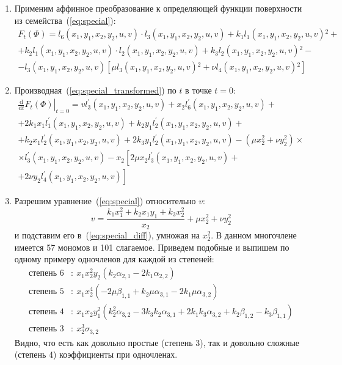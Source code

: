 \documentclass[../main.tex]{subfiles}
\begin{document}
\begin{enumerate}
\item Применим аффинное преобразование к определяющей функции поверхности из семейства~(\ref{eq:special}):
\begin{multline}\label{eq:special_transformed}
F_t(\Phi) = l_6(x_1, y_1, x_2, y_2, u, v) \cdot l_3(x_1, y_1, x_2, y_2, u, v) + k_1 l_1(x_1, y_1, x_2, y_2, u, v){}^2 + \\ + k_2 l_1(x_1, y_1, x_2, y_2, u, v)\cdot l_2(x_1, y_1, x_2, y_2, u, v) + k_3 l_2(x_1, y_1, x_2, y_2, u, v){}^2 - \\ 
- l_3(x_1, y_1, x_2, y_2, u, v) \left[\mu l_3(x_1, y_1, x_2, y_2, u, v){}^2+\nu  l_4(x_1, y_1, x_2, y_2, u, v){}^2\right]
\end{multline}

\item Производная~(\ref{eq:special_transformed}) по $t$ в точке $t = 0$:
\begin{multline}\label{eq:special_diff}
\left.\frac{\mathrm d}{\mathrm{d}t} F_t\left(\Phi\right)\right|_{t = 0} = v l_3^{\prime}(x_1, y_1, x_2, y_2, u, v) + x_2 l_6^{\prime}(x_1, y_1, x_2, y_2, u, v) + \\
+ 2 k_1 x_1 l_1^{\prime}(x_1, y_1, x_2, y_2, u, v) + k_2 y_1 l_2^{\prime}(x_1, y_1, x_2, y_2, u, v) + \\
+ k_2 x_1 l_2^{\prime}(x_1, y_1, x_2, y_2, u, v) +2 k_3 y_1 l_2^{\prime}(x_1, y_1, x_2, y_2, u, v) - \left(\mu x_2^2+\nu  y_2^2\right) \times \\
\times l_3^{\prime}(x_1, y_1, x_2, y_2, u, v) - x_2 \left[2 \mu  x_2 l_3^{\prime}(x_1, y_1, x_2, y_2, u, v) + \right. \\
\left. +2 \nu  y_2 l_4^{\prime}(x_1, y_1, x_2, y_2, u, v)\right]
\end{multline}

\item Разрешим уравнение~(\ref{eq:special}) относительно $v$:
$$
v = \frac{k_1 x_1^2 + k_2 x_1 y_1 + k_3 x_2^2}{x_2} +  \mu x_2^2 + \nu y_2^2
$$
и подставим его в~(\ref{eq:special_diff}), умножая на $x_2^2$. В данном многочлене имеется 57 мономов и 101 слагаемое. Приведем подобные и выпишем по одному примеру одночленов для каждой из степеней:
\begin{align*}
\text{степень 6}&:\ x_1 x_2^2 y_2 \left(k_2 \alpha _{2,1}-2 k_1 \alpha _{2,2}\right) \\
\text{степень 5}&:\ x_1 x_2^4 \left(-2 \mu  \beta _{1,1}+k_2 \mu  \alpha _{3,1}-2 k_1 \mu  \alpha _{3,2}\right) \\ 
\text{степень 4}&:\ x_1 x_2 y_1^2 \left(k_2^2 \alpha _{3,2}-3 k_3 k_2 \alpha _{3,1}+2 k_1 k_3 \alpha _{3,2}+k_2 \beta _{1,2}-k_3 \beta _{1,1}\right) \\
\text{степень 3}&:\ x_2^3 \sigma _{3,2}
\end{align*}
Видно, что есть как довольно простые (степень 3), так и довольно сложные (степень 4) коэффициенты при одночленах.


\end{enumerate}
\end{document}
